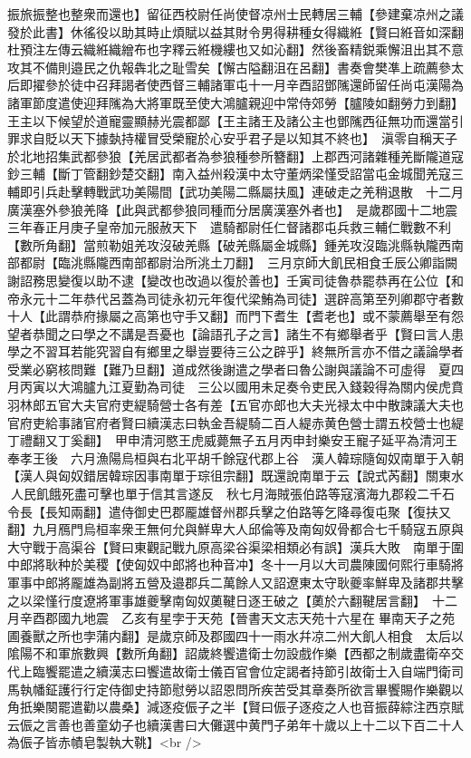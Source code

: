 振旅振整也整衆而還也】留征西校尉任尚使督凉州士民轉居三輔【參建棄凉州之議發於此書】休徭役以助其時止煩賦以益其財令男得耕種女得織絍【賢曰絍音如深翻杜預注左傳云織絍織繒布也字釋云絍機縷也又如沁翻】然後畜精鋭乘懈沮出其不意攻其不備則邉民之仇報犇北之耻雪矣【懈古隘翻沮在呂翻】書奏會樊凖上疏薦參太后即擢參於徒中召拜謁者使西督三輔諸軍屯十一月辛酉詔鄧隲還師留任尚屯漢陽為諸軍節度遣使迎拜隲為大將軍既至使大鴻臚親迎中常侍郊勞【臚陵如翻勞力到翻】王主以下候望於道寵靈顯赫光震都鄙【王主諸王及諸公主也鄧隲西征無功而還當引罪求自貶以天下據埶持權冒受榮寵於心安乎君子是以知其不終也】　滇零自稱天子於北地招集武都參狼【羌居武都者為参狼種参所簪翻】上郡西河諸雜種羌斷隴道寇鈔三輔【斷丁管翻鈔楚交翻】南入益州殺漢中太守董炳梁慬受詔當屯金城聞羌寇三輔即引兵赴擊轉戰武功美陽間【武功美陽二縣屬扶風】連破走之羌稍退散　十二月廣漢塞外參狼羌降【此與武都參狼同種而分居廣漢塞外者也】　是歲郡國十二地震三年春正月庚子皇帝加元服赦天下　遣騎都尉任仁督諸郡屯兵救三輔仁戰數不利【數所角翻】當煎勒姐羌攻沒破羌縣【破羌縣屬金城縣】鍾羌攻沒臨洮縣執隴西南部都尉【臨洮縣隴西南部都尉治所洮土刀翻】　三月京師大飢民相食壬辰公卿詣闕謝詔務思變復以助不逮【變改也改過以復於善也】壬寅司徒魯恭罷恭再在公位【和帝永元十二年恭代呂蓋為司徒永初元年復代梁鮪為司徒】選辟高第至列卿郡守者數十人【此謂恭府掾屬之高第也守手又翻】而門下耆生【耆老也】或不蒙薦舉至有怨望者恭聞之曰學之不講是吾憂也【論語孔子之言】諸生不有鄉舉者乎【賢曰言人患學之不習耳若能究習自有鄉里之舉豈要待三公之辟乎】終無所言亦不借之議論學者受業必窮核問難【難乃旦翻】道成然後謝遣之學者曰魯公謝與議論不可虛得　夏四月丙寅以大鴻臚九江夏勤為司徒　三公以國用未足奏令吏民入錢穀得為關内侯虎賁羽林郎五官大夫官府吏緹騎營士各有差【五官亦郎也大夫光禄太中中散諫議大夫也官府吏給事諸官府者賢曰續漢志曰執金吾緹騎二百人緹赤黄色營士謂五校營士也緹丁禮翻又丁奚翻】　甲申清河愍王虎威薨無子五月丙申封樂安王寵子延平為清河王奉孝王後　六月漁陽烏桓與右北平胡千餘寇代郡上谷　漢人韓琮隨匈奴南單于入朝【漢人與匈奴錯居韓琮因事南單于琮徂宗翻】既還說南單于云【說式芮翻】關東水人民飢餓死盡可擊也單于信其言遂反　秋七月海賊張伯路等寇濱海九郡殺二千石令長【長知兩翻】遣侍御史巴郡龎雄督州郡兵擊之伯路等乞降尋復屯聚【復扶又翻】九月鴈門烏桓率衆王無何允與鮮卑大人邱倫等及南匈奴骨都合七千騎寇五原與大守戰于高渠谷【賢曰東觀記戰九原高梁谷渠梁相類必有誤】漢兵大敗　南單于圍中郎將耿种於美稷【使匈奴中郎將也种音冲】冬十一月以大司農陳國何熙行車騎將軍事中郎將龎雄為副將五營及邉郡兵二萬餘人又詔遼東太守耿夔率鮮卑及諸郡共擊之以梁慬行度遼將軍事雄夔擊南匈奴薁鞬日逐王破之【薁於六翻鞬居言翻】　十二月辛酉郡國九地震　乙亥有星孛于天苑【晉書天文志天苑十六星在畢南天子之苑圃養獸之所也孛蒲内翻】是歲京師及郡國四十一雨水幷凉二州大飢人相食　太后以隂陽不和軍旅數興【數所角翻】詔歲終饗遣衛士勿設戲作樂【西都之制歲盡衛卒交代上臨饗罷遣之續漢志曰饗遣故衛士儀百官會位定謁者持節引故衛士入自端門衛司馬執幡鉦護行行定侍御史持節慰勞以詔恩問所疾苦受其章奏所欲言畢饗賜作樂觀以角扺樂闋罷遣勸以農桑】減逐疫侲子之半【賢曰侲子逐疫之人也音振薛綜注西京賦云侲之言善也善童幼子也續漢書曰大儺選中黄門子弟年十歲以上十二以下百二十人為侲子皆赤幘皂製執大鞉】<br />
